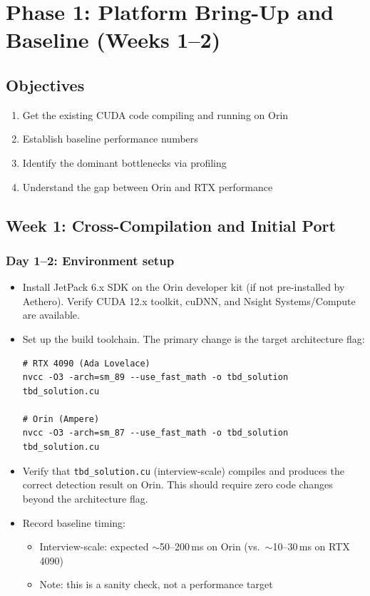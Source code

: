 \documentclass[11pt,letterpaper]{article}
\begin{document}
\section{Phase 1: Platform Bring-Up and Baseline (Weeks 1--2)}
\label{sec:phase1}

\subsection{Objectives}

\begin{enumerate}[leftmargin=2em]
    \item Get the existing CUDA code compiling and running on Orin
    \item Establish baseline performance numbers
    \item Identify the dominant bottlenecks via profiling
    \item Understand the gap between Orin and RTX performance
\end{enumerate}

\subsection{Week 1: Cross-Compilation and Initial Port}

\subsubsection{Day 1--2: Environment setup}

\begin{itemize}[leftmargin=2em]
    \item Install JetPack 6.x SDK on the Orin developer kit (if not
    pre-installed by Aethero). Verify CUDA 12.x toolkit, cuDNN, and
    Nsight Systems/Compute are available.
    \item Set up the build toolchain. The primary change is the target
    architecture flag:

\begin{lstlisting}[style=bashstyle]
# RTX 4090 (Ada Lovelace)
nvcc -O3 -arch=sm_89 --use_fast_math -o tbd_solution tbd_solution.cu

# Orin (Ampere)
nvcc -O3 -arch=sm_87 --use_fast_math -o tbd_solution tbd_solution.cu
\end{lstlisting}

    \item Verify that \texttt{tbd\_solution.cu} (interview-scale) compiles
    and produces the correct detection result on Orin. This should require
    zero code changes beyond the architecture flag.

    \item Record baseline timing:
    \begin{itemize}
        \item Interview-scale: expected $\sim$50--200\,ms on Orin
            (vs.\ $\sim$10--30\,ms on RTX 4090)
        \item Note: this is a sanity check, not a performance target
    \end{itemize}
\end{itemize}
\end{document}

